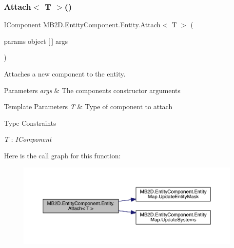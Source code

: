 \subsubsection{\texorpdfstring{Attach$<$ T $>$()}{Attach< T >()}}
{\footnotesize\ttfamily \hyperlink{interface_m_b2_d_1_1_entity_component_1_1_i_component}{I\+Component} \hyperlink{class_m_b2_d_1_1_entity_component_1_1_entity_aa86d1be62df6d89b981d1000c856a306}{M\+B2\+D.\+Entity\+Component.\+Entity.\+Attach}$<$ T $>$ (\begin{DoxyParamCaption}\item[{params object \mbox{[}$\,$\mbox{]}}]{args }\end{DoxyParamCaption})\hspace{0.3cm}{\ttfamily [inline]}}



Attaches a new component to the entity. 


\begin{DoxyParams}{Parameters}
{\em args} & The components constructor arguments\\
\hline
\end{DoxyParams}

\begin{DoxyTemplParams}{Template Parameters}
{\em T} & Type of component to attach\\
\hline
\end{DoxyTemplParams}
\begin{Desc}
\item[Type Constraints]\begin{description}
\item[{\em T} : {\em I\+Component}]\end{description}
\end{Desc}
Here is the call graph for this function\+:\nopagebreak
\begin{figure}[H]
\begin{center}
\leavevmode
\includegraphics[width=350pt]{class_m_b2_d_1_1_entity_component_1_1_entity_a53ffea8d43423903712540fc2df6b82d_cgraph}
\end{center}
\end{figure}
\hypertarget{class_m_b2_d_1_1_entity_component_1_1_entity_a9194f3b1f3370d2ecb47efe077ba4050}{}\label{class_m_b2_d_1_1_entity_component_1_1_entity_a9194f3b1f3370d2ecb47efe077ba4050} 
